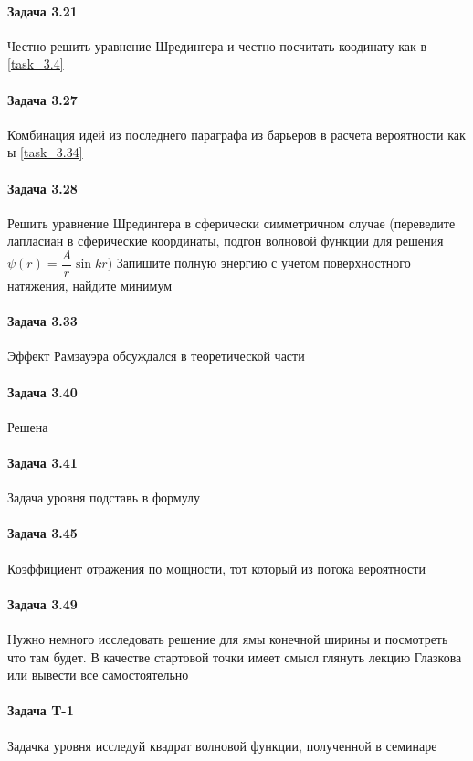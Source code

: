 \documentclass[12pt]{article}
\begin{document}
\paragraph{Задача 3.21} Честно решить уравнение Шредингера и честно посчитать коодинату как в \ref{task_3.4}
\paragraph{Задача 3.27} Комбинация идей из последнего параграфа из барьеров в расчета вероятности как ы \ref{task_3.34}
\paragraph{Задача 3.28} Решить уравнение Шредингера в сферически симметричном случае (переведите лапласиан в сферические координаты, подгон волновой функции для решения $\psi(r) = \dfrac{A}{r}\sin{kr}$) Запишите полную энергию с учетом поверхностного натяжения, найдите минимум
\paragraph{Задача 3.33} Эффект Рамзауэра обсуждался в теоретической части
\paragraph{Задача 3.40} Решена
\paragraph{Задача 3.41} Задача уровня подставь в формулу
\paragraph{Задача 3.45} Коэффициент отражения по мощности, тот который из потока вероятности 
\paragraph{Задача 3.49} Нужно немного исследовать решение для ямы конечной ширины и посмотреть что там будет. В качестве стартовой точки имеет смысл глянуть лекцию Глазкова или вывести все самостоятельно
\paragraph{Задача T-1} Задачка уровня исследуй квадрат волновой функции, полученной в семинаре
\end{document}
